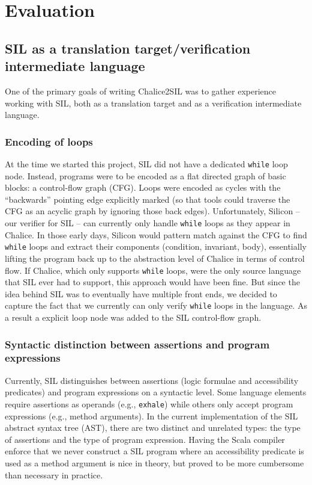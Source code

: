 
\section{Evaluation}\label{sct:eval}

\subsection{SIL as a translation target/verification intermediate language}
One of the primary goals of writing Chalice2SIL was to gather experience working with SIL, both as a translation target and as a verification intermediate language. 

\subsubsection{Encoding of loops}
At the time we started this project, SIL did not have a dedicated \lstinline[language=Chalice]!while! loop node. 
Instead, programs were to be encoded as a flat directed graph of basic blocks: a control-flow graph (CFG).
Loops were encoded as cycles with the ``backwards'' pointing edge explicitly marked (so that tools could traverse the CFG as an acyclic graph by ignoring those back edges).
Unfortunately, Silicon -- our verifier for SIL -- can currently only handle \lstinline[language=Chalice]!while! loops as they appear in Chalice. 
In those early days, Silicon would pattern match against the CFG to find \lstinline[language=Chalice]!while! loops and extract their components (condition, invariant, body), essentially lifting the program back up to the abstraction level of Chalice in terms of control flow.
If Chalice, which only supports \lstinline[language=Chalice]!while! loops, were the only source language that SIL ever had to support, this approach would have been fine.
But since the idea behind SIL was to eventually have multiple front ends, we decided to capture the fact that we currently can only verify \lstinline[language=Chalice]!while! loops in the language.
As a result a explicit loop node was added to the SIL control-flow graph.

\subsubsection{Syntactic distinction between assertions and program expressions}
Currently, SIL distinguishes between assertions (logic formulae and accessibility predicates) and program expressions on a syntactic level. 
Some language elements require assertions as operands (e.g., \lstinline[language=SIL]!exhale!) while others only accept program expressions (e.g., method arguments).
In the current implementation of the SIL abstract syntax tree (AST), there are two distinct and unrelated types: the type of assertions and the type of program expression.
Having the Scala compiler enforce that we never construct a SIL program where an accessibility predicate is used as a method argument is nice in theory, but proved to be more cumbersome than necessary in practice.

